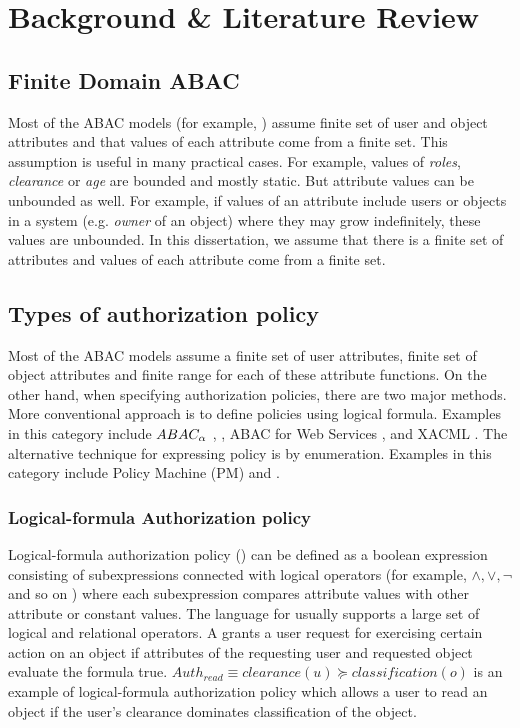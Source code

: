 \chapter{Background \& Literature Review}

\section{Finite Domain ABAC}
	Most of the ABAC models (for example, \cite{abacAlpha,hgabac,abac-ws,abac-for-web-service}) assume finite set of user and  object attributes and that values of each attribute come from a finite set. This assumption is useful in many practical cases. For example, values of \textit{roles}, \textit{clearance} or \textit{age} are bounded and mostly static. But attribute values can be unbounded as well. For example, if values of an attribute include users or objects in a system  (e.g. \textit{owner} of an object) where they may grow indefinitely, these values are unbounded.  In this dissertation, we assume that there is a finite set of attributes and values of each attribute come from a finite set.
	
\section{Types of authorization policy}
	Most of the ABAC models assume a finite set of user attributes, finite set of object attributes and finite range for each of these attribute functions. On the other hand, when specifying authorization policies, there are two major methods. More conventional approach is to define policies using logical formula. Examples in this category include $ABAC_\alpha${} \cite{abacAlpha}, \hgabac{} \cite{hgabac}, ABAC for Web Services \cite{abac-for-web-service}, and XACML \cite{xacml}. The alternative technique for expressing policy is by enumeration. Examples in this category include Policy Machine (PM) \cite{policy-machine} and \twoSortedRBAC{} \cite{two-sorted-rbac}.
	
\subsection{Logical-formula Authorization policy}
	Logical-formula authorization policy (\LAP{}) can be defined as a boolean expression consisting of subexpressions connected with logical operators (for example, $\land, \lor, \lnot$ and so on ) where each subexpression compares attribute values with other attribute or constant values. The language for \LAP{} usually supports a large set of logical and relational operators. A \LAP{} grants a user request for exercising certain action on an object if attributes of the requesting user and requested object evaluate the formula true. $Auth_{read} \equiv clearance(u) \succeq classification(o)$ is an example of  logical-formula authorization policy which allows a user to read an object if the user's clearance dominates classification of the object.
	
